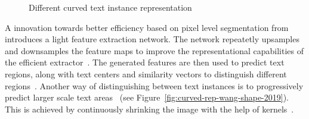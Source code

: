 \begin{figure}[ht]
    \centering\scriptsize
    \caption{%
        Different curved text instance representation\label{fig:curved-text-representations}
    }
\end{figure}
A innovation towards better efficiency based on pixel level segmentation
from~\cite{wang_efficient_2019} introduces a light feature extraction network.
The network repeatetly upsamples and downsamples the feature maps to improve the representational
capabilities of the efficient extractor~\citep{wang_efficient_2019}.
The generated features are then used to predict text regions, along with text centers and similarity
vectors to distinguish different regions~\citep{wang_efficient_2019}.
Another way of distinguishing between text instances is to progressively predict larger scale text
areas~\citep{wang_shape_2019} (see Figure~\ref{fig:curved-rep-wang-shape-2019}).
This is achieved by continuously shrinking the image with the help of
kernels~\citep{wang_shape_2019}.
